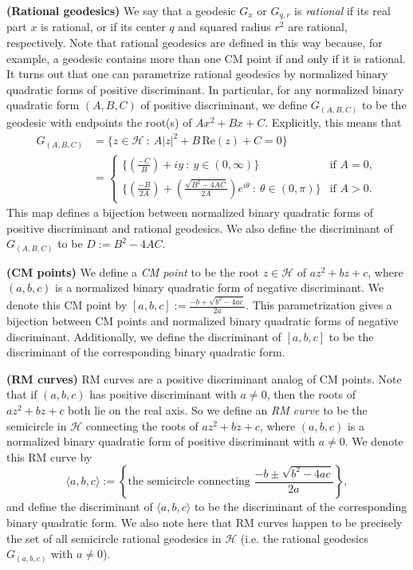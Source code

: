 \documentclass[11pt,letterpaper,reqno]{amsart}
\numberwithin{equation}{section}
\numberwithin{figure}{section}
\numberwithin{table}{section}
\newcommand{\lrp}[1]{\left(#1\right)}
\newcommand{\lrcb}[1]{\left\{#1\right\}}
\newcommand{\HH}{\mathcal{H}}
\begin{document}
\textbf{(Rational geodesics)} 
We say that a geodesic $G_x$ or $G_{q,r}$ is \textit{rational} if its real part $x$ is rational, or if its center $q$ and squared radius $r^2$ are rational, respectively. 
Note that rational geodesics are defined in this way because, for example, a geodesic contains more than one CM point if and only if it is rational.
It turns out that one can parametrize rational geodesics by normalized binary quadratic forms of positive discriminant. In particular, for any normalized binary quadratic form $(A,B,C)$ of positive discriminant, we define $G_{(A,B,C)}$ to be the geodesic with endpoints the root(s) of $Ax^2+Bx+C$. Explicitly, this means that
\begin{align}
    G_{(A,B,C)}
    &= \{z \in \HH ~:~ A|z|^2+B\,\mathrm{Re}(z) + C = 0 \} \label{eqn:GABC-set-formula}\\
    &= 
    \begin{cases}
        \{\lrp{\frac{-C}{B}}+iy ~:~ y \in (0,\infty)\} & \text{if } A=0, \\
        \{\lrp{\frac{-B}{2A}} + \lrp{\frac{\sqrt{B^2-4AC}}{2A}}e^{i\theta} ~:~ \theta \in (0,\pi)\} & \text{if } A>0.
    \end{cases} 
\end{align}
This map defines a bijection between normalized binary quadratic forms of positive discriminant and rational geodesics. We also define the discriminant of $G_{(A,B,C)}$ to be $D := B^2-4AC$. 


\textbf{(CM points)} We define a \textit{CM point} to be the root $z \in \HH$ of $az^2+bz+c$, where $(a,b,c)$ is a normalized binary quadratic form of negative discriminant. We denote this CM point by $[a,b,c] := \frac{-b + \sqrt{b^2-4ac}}{2a}$. This parametrization gives a bijection between CM points and normalized binary quadratic forms of negative discriminant. Additionally, we define the discriminant of $[a,b,c]$ to be
the discriminant of the corresponding binary quadratic form.


\textbf{(RM curves)} RM curves are a positive discriminant analog of CM points.
Note that if $(a,b,c)$ has positive discriminant with $a \ne 0$, then the roots of $az^2+bz+c$ both lie on the real axis. So we define an \textit{RM curve} to be the semicircle in $\HH$ connecting the roots of $az^2+bz+c$, where $(a,b,c)$ is a normalized binary quadratic form of positive discriminant with $a \ne 0$. We denote this RM curve by 
$$\langle a,b,c\rangle := \lrcb{\text{the semicircle connecting }  \frac{-b \pm \sqrt{b^2-4ac}}{2a}},$$ 
and define the discriminant of $\langle a,b,c \rangle$ to be 
the discriminant of the corresponding binary quadratic form.
We also note here that RM curves happen to be precisely the set of all semicircle rational geodesics in $\HH$ (i.e. the rational geodesics $G_{(a,b,c)}$ with $a\ne0$). 
\end{document}
